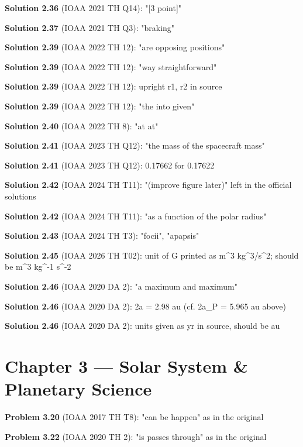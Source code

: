 \noindent\textbf{Solution 2.36} (IOAA 2021 TH Q14): "[3 point]"
\smallskip

\noindent\textbf{Solution 2.37} (IOAA 2021 TH Q3): "braking"
\smallskip

\noindent\textbf{Solution 2.39} (IOAA 2022 TH 12): "are opposing positions"
\smallskip

\noindent\textbf{Solution 2.39} (IOAA 2022 TH 12): "way straightforward"
\smallskip

\noindent\textbf{Solution 2.39} (IOAA 2022 TH 12): upright r1, r2 in source
\smallskip

\noindent\textbf{Solution 2.39} (IOAA 2022 TH 12): "the into given"
\smallskip

\noindent\textbf{Solution 2.40} (IOAA 2022 TH 8): "at at"
\smallskip

\noindent\textbf{Solution 2.41} (IOAA 2023 TH Q12): "the mass of the spacecraft mass"
\smallskip

\noindent\textbf{Solution 2.41} (IOAA 2023 TH Q12): 0.17662 for 0.17622
\smallskip

\noindent\textbf{Solution 2.42} (IOAA 2024 TH T11): "(improve figure later)" left in the official solutions
\smallskip

\noindent\textbf{Solution 2.42} (IOAA 2024 TH T11): "as a function of the polar radius"
\smallskip

\noindent\textbf{Solution 2.43} (IOAA 2024 TH T3): "focii", "apapsis"
\smallskip

\noindent\textbf{Solution 2.45} (IOAA 2026 TH T02): unit of G printed as m\^{}3 kg\^{}3/s\^{}2; should be m\^{}3 kg\^{}-1 s\^{}-2
\smallskip

\noindent\textbf{Solution 2.46} (IOAA 2020 DA 2): "a maximum and maximum"
\smallskip

\noindent\textbf{Solution 2.46} (IOAA 2020 DA 2): 2a = 2.98 au (cf. 2a\_P = 5.965 au above)
\smallskip

\noindent\textbf{Solution 2.46} (IOAA 2020 DA 2): units given as yr in source, should be au
\smallskip

\section*{Chapter 3 --- Solar System \& Planetary Science}

\noindent\textbf{Problem 3.20} (IOAA 2017 TH T8): "can be happen" as in the original
\smallskip

\noindent\textbf{Problem 3.22} (IOAA 2020 TH 2): "is passes through" as in the original
\smallskip

